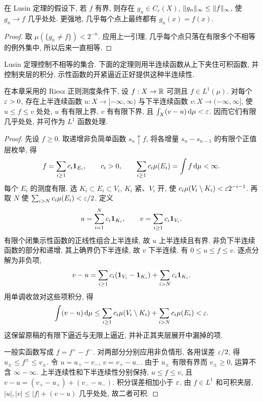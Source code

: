\begin{corollary}\label{ra:c4:continuousae}
在 Lusin 定理的假设下, 若 $f$ 有界, 则存在 $g_n\in C_c(X)$, $\lVert g_n\rVert_\infty\le\lVert f\rVert_\infty$, 使 $g_n\to f$ 几乎处处. 更强地, 几乎每个点上最终都有 $g_n(x)=f(x)$.
\end{corollary}
\begin{proof}
取 $\mu(\{g_n\ne f\})<2^{-n}$. 应用上一引理, 几乎每个点只落在有限多个不相等的例外集中, 所以后来一直相等.
\end{proof}


Lusin 定理控制不相等的集合. 下面的定理则用半连续函数从上下夹住可积函数, 并控制夹层的积分. 示性函数的开紧逼近正好提供这种半连续性.

\begin{theorem}\label{ra:c4:vitalicara}
在本章采用的 Riesz 正则测度条件下, 设 $f:X\to\mathbb R$ 可测且 $f\in L^1(\mu)$. 对每个 $\varepsilon>0$, 存在上半连续函数 $u:X\to[-\infty,\infty)$ 与下半连续函数 $v:X\to(-\infty,\infty]$, 使 $u\le f\le v$ 处处, $u$ 有有限上界, $v$ 有有限下界, 且 $\int_X(v-u)\,\mathrm d\mu<\varepsilon$. 因而它们有限几乎处处, 并可作为 $L^1$ 函数处理.
\end{theorem}
\begin{proof}
先设 $f\ge0$. 取递增非负简单函数 $s_n\uparrow f$, 将各增量 $s_n-s_{n-1}$ 的有限个正值层枚举, 得
\[
 f=\sum_{i\ge1}c_i\mathbf 1_{E_i},\qquad
 c_i>0,\qquad\sum_{i\ge1}c_i\mu(E_i)=\int f\,\mathrm d\mu<\infty.
\]
每个 $E_i$ 的测度有限. 选 $K_i\subset E_i\subset V_i$, $K_i$ 紧、$V_i$ 开, 使 $c_i\mu(V_i\setminus K_i)<\varepsilon2^{-i-1}$. 再取 $N$ 使 $\sum_{i>N}c_i\mu(E_i)<\varepsilon/2$. 定义
\[
 u=\sum_{i=1}^Nc_i\mathbf 1_{K_i},\qquad
 v=\sum_{i\ge1}c_i\mathbf 1_{V_i}.
\]
有限个闭集示性函数的正线性组合上半连续, 故 $u$ 上半连续且有界. 非负下半连续函数的部分和递增, 其上确界仍下半连续, 故 $v$ 下半连续. 有 $0\le u\le f\le v$. 逐点分解为非负项,
\[
 v-u=\sum_{i\ge1}c_i(\mathbf 1_{V_i}-\mathbf 1_{K_i})
             +\sum_{i>N}c_i\mathbf 1_{K_i}.
\]
用单调收敛对这些项积分, 得
\[
 \int(v-u)\,\mathrm d\mu
 \le\sum_{i\ge1}c_i\mu(V_i\setminus K_i)
       +\sum_{i>N}c_i\mu(E_i)<\varepsilon.
\]
这保留原稿的有限下逼近与无限上逼近, 并补正其夹层展开中漏掉的项.

一般实函数写成 $f=f^+-f^-$. 对两部分分别应用非负情形, 各用误差 $\varepsilon/2$, 得 $u_\pm\le f^\pm\le v_\pm$. 令 $u=u_+-v_-$, $v=v_+-u_-$. 由于 $u_\pm$ 有限有界而 $v_\pm\ge0$, 运算不含 $\infty-\infty$. 上半连续性和下半连续性分别保持, $u\le f\le v$, 且 $v-u=(v_+-u_+)+(v_--u_-)$. 积分误差相加小于 $\varepsilon$. 由 $f\in L^1$ 和可积夹层, $|u|,|v|\le |f|+(v-u)$ 几乎处处, 故二者可积.
\end{proof}


